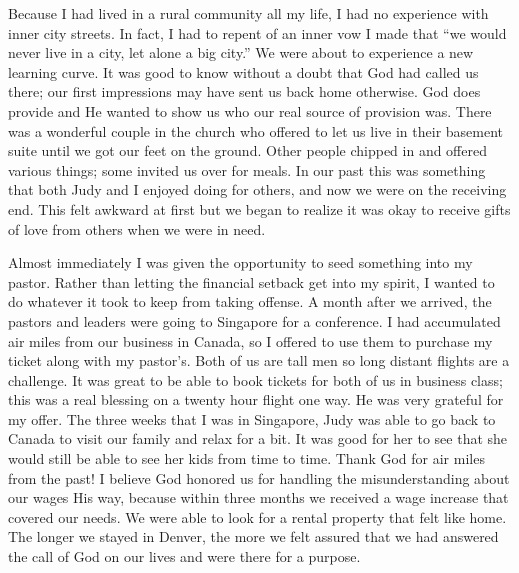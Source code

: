 \documentclass[oneside]{book}
\begin{document}
Because I had lived in a rural community all my life, I had no experience with inner city streets.  In fact, I had to repent of an inner vow I made that “we would never live in a city, let alone a big city.” We were about to experience a new learning curve. It was good to know without a doubt that God had called us there; our first impressions may have sent us back home otherwise. God does provide and He wanted to show us who our real source of provision was. There was a wonderful couple in the church who offered to let us live in their basement suite until we got our feet on the ground. Other people chipped in and offered various things; some invited us over for meals. In our past this was something that both Judy and I enjoyed doing for others, and now we were on the receiving end. This felt awkward at first but we began to realize it was okay to receive gifts of love from others when we were in need. 

Almost immediately I was given the opportunity to seed something into my pastor. Rather than letting the financial setback get into my spirit, I wanted to do whatever it took to keep from taking offense. A month after we arrived, the pastors and leaders were going to Singapore for a conference. I had accumulated air miles from our business in Canada, so I offered to use them to purchase my ticket along with my pastor’s. Both of us are tall men so long distant flights are a challenge. It was great to be able to book tickets for both of us in business class; this was a real blessing on a twenty hour flight one way. He was very grateful for my offer. The three weeks that I was in Singapore, Judy was able to go back to Canada to visit our family and relax for a bit. It was good for her to see that she would still be able to see her kids from time to time. Thank God for air miles from the past! I believe God honored us for handling the misunderstanding about our wages His way, because within three months we received a wage increase that covered our needs. We were able to look for a rental property that felt like home. The longer we stayed in Denver, the more we felt assured that we had answered the call of God on our lives and were there for a purpose. 
\end{document}
